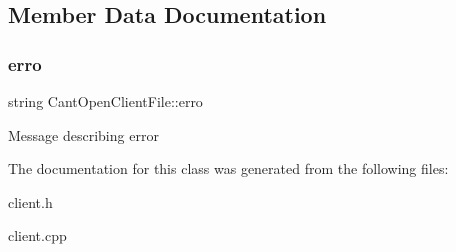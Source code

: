 \subsection{Member Data Documentation}
\mbox{\label{class_cant_open_client_file_aa4aa82cf39a9e960a76d32da6d379b05}} 
\subsubsection{\texorpdfstring{erro}{erro}}
{\footnotesize\ttfamily string Cant\+Open\+Client\+File\+::erro}

Message describing error 

The documentation for this class was generated from the following files\+:\begin{DoxyCompactItemize}
\item 
client.\+h\item 
client.\+cpp\end{DoxyCompactItemize}
